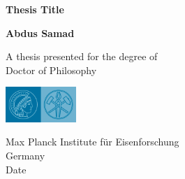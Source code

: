 \begin{titlepage}
   \begin{center}
       \vspace*{10mm}
 
       \textbf{\huge Thesis Title}
 
 
       \vspace{1mm}
 
       \textbf{Abdus Samad}
 
       \vspace{440px}
       
 
       A thesis presented for the degree of\\
       Doctor of Philosophy
 
       \vspace{1mm}
 
       \includegraphics[width=0.2\textwidth]{logo}
 
       Max Planck Institute für Eisenforschung\\
       Germany\\
       Date
 
   \end{center}
\end{titlepage}
